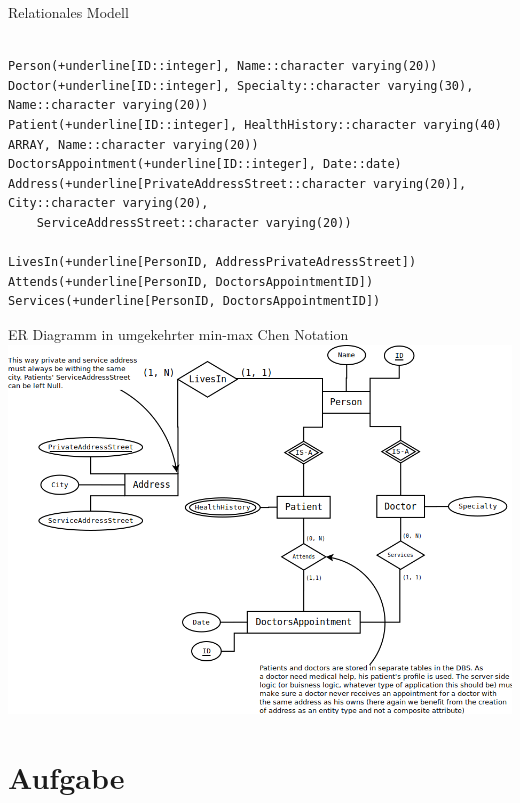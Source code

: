 \begin{itemize}
Relationales Modell \\

\begin{Verbatim}[commandchars=+\[\]]

Person(+underline[ID::integer], Name::character varying(20))
Doctor(+underline[ID::integer], Specialty::character varying(30), Name::character varying(20))
Patient(+underline[ID::integer], HealthHistory::character varying(40) ARRAY, Name::character varying(20))
DoctorsAppointment(+underline[ID::integer], Date::date)
Address(+underline[PrivateAddressStreet::character varying(20)], City::character varying(20), 
	ServiceAddressStreet::character varying(20))

LivesIn(+underline[PersonID, AddressPrivateAdressStreet])
Attends(+underline[PersonID, DoctorsAppointmentID])
Services(+underline[PersonID, DoctorsAppointmentID])
\end{Verbatim}

ER Diagramm in umgekehrter min-max Chen Notation\\

\includegraphics[width=\textwidth]{./src/exercise3_B.png}

\end{itemize}

\section{Aufgabe}

